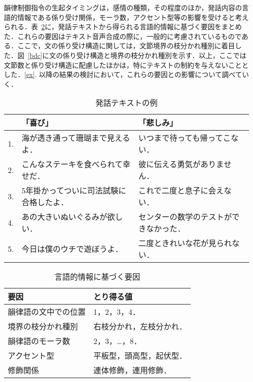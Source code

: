 \documentclass[japanese]{jnlp_1.3b}
\begin{document}
韻律制御指令の生起タイミングは，感情の種類，その程度のほか，発話内容の言語的情報である係り受け関係，モーラ数，アクセント型等の影響を受けると考えられる．表~\ref{factors}に，発話テキストから得られる言語的情報に基づく要因をまとめた．これらの要因はテキスト音声合成の際に，一般的に考慮されているものである．ここで，文の係り受け構造に関しては，文節境界の枝分かれ種別に着目した．図~\ref{bdc}に文の係り受け構造と境界の枝分かれ種別を示す．以上，ここでは文節数と係り受け構造に配慮したほかは，特にテキストの制約を与えないこととした．\ref{ex}. 以降の結果の検討において，これらの要因との影響について調べていく．

\begin{table}[b]
\begin{center}
\caption{発話テキストの例}
\label{hatuwa}
\begin{tabular}{p{}p{}p{}}
\hline
&「喜び」&「悲しみ」\\
\hline
1.& 海が透き通って珊瑚まで見えるよ．&いつまで待っても帰ってこない．\\
2.& こんなステーキを食べられて幸せだ．&彼に伝える勇気がありません．\\
3.& 5年掛かってついに司法試験に合格したよ．&これで二度と息子に会えない．\\
4.& あの大きいぬいぐるみが欲しい．&センターの数学のテストができなかった．\\
5.& 今日は僕のウチで遊ぼうよ．&二度ときれいな花が見られない．\\
\hline
\end{tabular}
\end{center}
\end{table}

\begin{table}[b]
\begin{center}
\caption{言語的情報に基づく要因}
\label{factors}
\begin{tabular}{ll}
\hline
要因 & とり得る値 \\
\hline
韻律語の文中での位置&1，2，3，4．\\
境界の枝分かれ種別&右枝分かれ，左枝分かれ．\\
韻律語のモーラ数&2，3，…，8．\\
アクセント型&平板型，頭高型，起伏型．\\
修飾関係&連体修飾，連用修飾．\\
\hline
\end{tabular}
\end{center}
\end{table}
\end{document}
